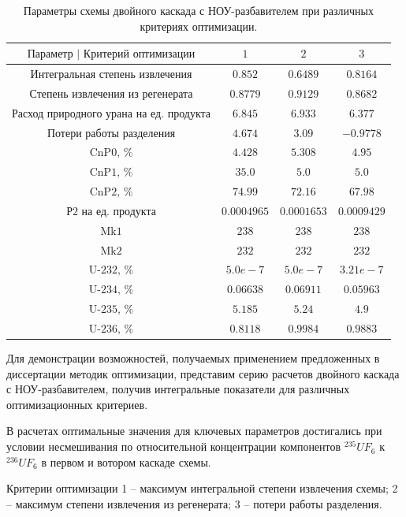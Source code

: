 \begin{table}
    \begin{tabular}{cccc}
        $\text{Параметр | Критерий оптимизации}$ & $\text{1}$ & $\text{2}$ & $\text{3}$\\ \hline
        $\text{Интегральная степень извлечения}$ & $0.852$ & $0.6489$ & $0.8164$\\ \hline
        $\text{Степень извлечения из регенерата}$ & $0.8779$ & $0.9129$ & $0.8682$\\ \hline
        $\text{Расход природного урана на ед. продукта}$ & $6.845$ & $6.933$ & $6.377$\\ \hline
        $\text{Потери работы разделения}$ & $4.674$ & $3.09$ & $-0.9778$\\ \hline
        $\text{CnP0, \%}$ & $4.428$ & $5.308$ & $4.95$\\ \hline
        $\text{CnP1, \%}$ & $35.0$ & $5.0$ & $5.0$\\ \hline
        $\text{CnP2, \%}$ & $74.99$ & $72.16$ & $67.98$\\ \hline
        $\text{Р2 на ед. продукта}$ & $0.0004965$ & $0.0001653$ & $0.0009429$\\ \hline
        $\text{Mk1}$ & $238$ & $238$ & $238$\\ \hline
        $\text{Mk2}$ & $232$ & $232$ & $232$\\ \hline
        $\text{U-232, \%}$ & $5.0e-7$ & $5.0e-7$ & $3.21e-7$\\ \hline
        $\text{U-234, \%}$ & $0.06638$ & $0.06911$ & $0.05963$\\ \hline
        $\text{U-235, \%}$ & $5.185$ & $5.24$ & $4.9$\\ \hline
        $\text{U-236, \%}$ & $0.8118$ & $0.9984$ & $0.9883$
    \end{tabular}
\caption{Параметры схемы двойного каскада с НОУ-разбавителем при различных критериях оптимизации.{\label{5opt5}}}
\end{table}


Для демонстрации возможностей, получаемых применением предложенных в диссертации методик оптимизации, представим серию расчетов двойного каскада с НОУ-разбавителем, получив интегральные показатели для различных оптимизационных критериев.

В расчетах оптимальные значения для ключевых параметров достигались при условии несмешивания по относительной концентрации компонентов $^{235}UF_6$ к $^{236}UF_6$ в первом и вотором каскаде схемы.

Критерии оптимизации 1 -- максимум интегральной степени извлечения схемы; 2 -- максимум степени извлечения из регенерата; 3 -- потери работы разделения.

